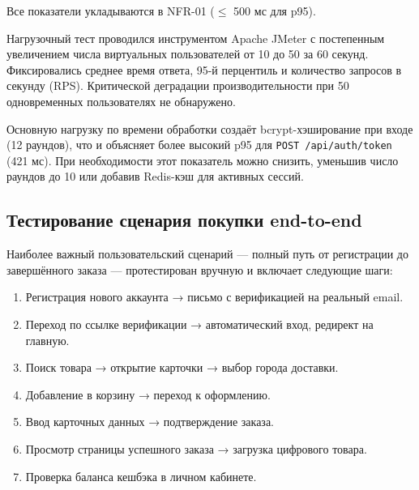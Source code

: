 \documentclass[14pt,a4paper]{extreport}
\begin{document}
\begin{table}[h!]
\centering
\caption{Результаты нагрузочного тестирования (50 пользователей)}
\end{table}

Все показатели укладываются в NFR-01 ($\leq$ 500 мс для p95).

Нагрузочный тест проводился инструментом Apache JMeter с постепенным увеличением числа виртуальных пользователей от 10 до 50 за 60 секунд. Фиксировались среднее время ответа, 95-й перцентиль и количество запросов в секунду (RPS). Критической деградации производительности при 50 одновременных пользователях не обнаружено.

Основную нагрузку по времени обработки создаёт bcrypt-хэширование при входе (12 раундов), что и объясняет более высокий p95 для \texttt{POST /api/auth/token} (421 мс). При необходимости этот показатель можно снизить, уменьшив число раундов до 10 или добавив Redis-кэш для активных сессий.

\subsection{Тестирование сценария покупки end-to-end}

Наиболее важный пользовательский сценарий — полный путь от регистрации до завершённого заказа — протестирован вручную и включает следующие шаги:

\begin{enumerate}
  \item Регистрация нового аккаунта → письмо с верификацией на реальный email.
  \item Переход по ссылке верификации → автоматический вход, редирект на главную.
  \item Поиск товара → открытие карточки → выбор города доставки.
  \item Добавление в корзину → переход к оформлению.
  \item Ввод карточных данных → подтверждение заказа.
  \item Просмотр страницы успешного заказа → загрузка цифрового товара.
  \item Проверка баланса кешбэка в личном кабинете.
\end{enumerate}
\end{document}
